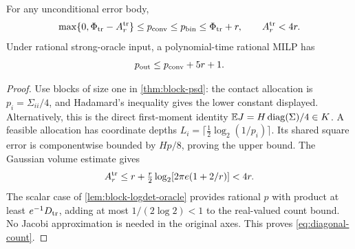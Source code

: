 \begin{corollary}\label{cor:diagonal-psd}
For any unconditional error body,
\begin{equation}\label{eq:diagonal-law}
 \max\{0,\Phi_{\rm tr}-A_r^{\rm tr}\}\le p_{\mathrm{conv}}\le p_{\mathrm{bin}}
 \le\Phi_{\rm tr}+r,\qquad A_r^{\rm tr}<4r.
\end{equation}
Under rational strong-oracle input, a polynomial-time rational MILP has
\begin{equation}\label{eq:diagonal-count}
 p_{\rm out}\le p_{\mathrm{conv}}+5r+1.
\end{equation}
\end{corollary}
\begin{proof}
Use blocks of size one in \cref{thm:block-psd}: the contact allocation
is $p_i=\Sigma_{ii}/4$, and Hadamard's inequality gives the lower
constant displayed. Alternatively, this is the direct first-moment
identity $\mathbb EJ=H\operatorname{diag}(\Sigma)/4\in K$.
A feasible allocation has coordinate depths
$L_i=\lceil\frac12\log_2(1/p_i)\rceil$. Its shared square error is
componentwise bounded by $Hp/8$, proving the upper bound. The Gaussian
volume estimate gives
\[
 A_r^{\rm tr}\le r+\tfrac r2\log_2[2\pi e(1+2/r)]<4r.
\]
The scalar case of \cref{lem:block-logdet-oracle} provides rational $p$
with product at least $e^{-1}D_{\rm tr}$, adding at most
$1/(2\log2)<1$ to the real-valued count bound. No Jacobi approximation
is needed in the original axes. This proves \eqref{eq:diagonal-count}.
\end{proof}

